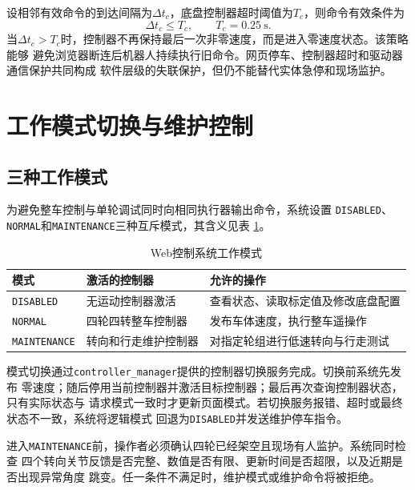 设相邻有效命令的到达间隔为$\Delta t_c$，底盘控制器超时阈值为$T_c$，则命令有效条件为
\begin{equation}
    \Delta t_c \leq T_c,
    \qquad T_c=0.25~\mathrm{s}.
    \label{eq:web-command-timeout}
\end{equation}
当$\Delta t_c>T_c$时，控制器不再保持最后一次非零速度，而是进入零速度状态。该策略能够
避免浏览器断连后机器人持续执行旧命令。网页停车、控制器超时和驱动器通信保护共同构成
软件层级的失联保护，但仍不能替代实体急停和现场监护。

\section{工作模式切换与维护控制}

\subsection{三种工作模式}

为避免整车控制与单轮调试同时向相同执行器输出命令，系统设置
\texttt{DISABLED}、\texttt{NORMAL}和\texttt{MAINTENANCE}三种互斥模式，其含义见表
\ref{tab:web-modes}。

\begin{table}[htbp]
    \centering
    \caption{Web控制系统工作模式}
    \label{tab:web-modes}
    \begin{tabularx}{\textwidth}{p{3.1cm}p{4.1cm}X}
        \toprule
        模式 & 激活的控制器 & 允许的操作 \\
        \midrule
        \texttt{DISABLED} & 无运动控制器激活 & 查看状态、读取标定值及修改底盘配置 \\
        \texttt{NORMAL} & 四轮四转整车控制器 & 发布车体速度，执行整车遥操作 \\
        \texttt{MAINTENANCE} & 转向和行走维护控制器 & 对指定轮组进行低速转向与行走测试 \\
        \bottomrule
    \end{tabularx}
\end{table}

模式切换通过\texttt{controller\_manager}提供的控制器切换服务完成。切换前系统先发布
零速度；随后停用当前控制器并激活目标控制器；最后再次查询控制器状态，只有实际状态与
请求模式一致时才更新页面模式。若切换服务报错、超时或最终状态不一致，系统将逻辑模式
回退为\texttt{DISABLED}并发送维护停车指令。

进入\texttt{MAINTENANCE}前，操作者必须确认四轮已经架空且现场有人监护。系统同时检查
四个转向关节反馈是否完整、数值是否有限、更新时间是否超限，以及近期是否出现异常角度
跳变。任一条件不满足时，维护模式或维护命令将被拒绝。

